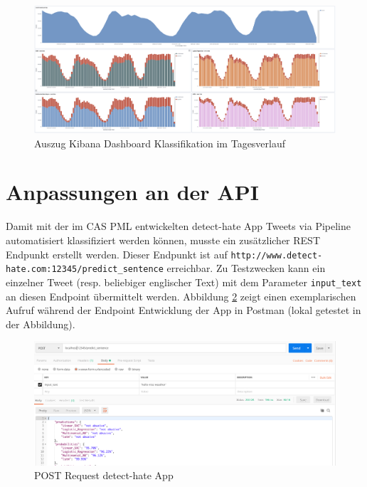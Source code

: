 \begin{figure}[H]
	\centering
		\includegraphics[scale=0.3]{images/kibana_dash_ab_noab1.png}
	\caption{Auszug Kibana Dashboard Klassifikation im Tagesverlauf}
	\label{fig:kibana_3}
\end{figure}

\section{Anpassungen an der API}
\label{sec:anpassung_api}
Damit mit der im CAS PML entwickelten detect-hate App Tweets via Pipeline automatisiert klassifiziert werden k{\"o}nnen, musste ein zus{\"a}tzlicher REST Endpunkt erstellt werden. Dieser Endpunkt ist auf \linebreak \texttt{http://www.detect-hate.com:12345/predict\_sentence} erreichbar. Zu Testzwecken kann ein einzelner Tweet (resp. beliebiger englischer Text) mit dem Parameter \texttt{input\_text} an diesen Endpoint {\"u}bermittelt werden. Abbildung \ref{fig:ppostman_post} zeigt einen exemplarischen Aufruf w{\"a}hrend der Endpoint Entwicklung der App in Postman (lokal getestet in der Abbildung). 

\begin{figure}[H]
	\centering
		\includegraphics[scale=0.3]{images/postman_app.png}
	\caption{POST Request detect-hate App}
	\label{fig:ppostman_post}
\end{figure}

